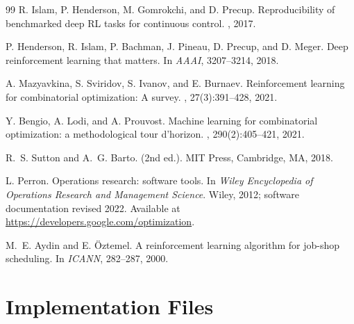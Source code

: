 \documentclass[10pt]{article}
\theoremstyle{definition}
\begin{document}
\begin{thebibliography}{99}
R. Islam, P. Henderson, M. Gomrokchi, and D. Precup.
\newblock Reproducibility of benchmarked deep RL tasks for
continuous control.
, 2017.

P. Henderson, R. Islam, P. Bachman, J. Pineau, D. Precup,
and D. Meger.
\newblock Deep reinforcement learning that matters.
\newblock In {\em AAAI}, 3207--3214, 2018.

A. Mazyavkina, S. Sviridov, S. Ivanov, and E. Burnaev.
\newblock Reinforcement learning for combinatorial
optimization: A survey.
, 27(3):391--428, 2021.

Y. Bengio, A. Lodi, and A. Prouvost.
\newblock Machine learning for combinatorial optimization:
a methodological tour d'horizon.
,
290(2):405--421, 2021.

R.~S. Sutton and A.~G. Barto.
(2nd ed.).
\newblock MIT Press, Cambridge, MA, 2018.

L. Perron.
\newblock Operations research: software tools.
\newblock In {\em Wiley Encyclopedia of Operations
Research and Management Science}.
Wiley, 2012; software documentation revised 2022.
\newblock Available at
\url{https://developers.google.com/optimization}.

M.~E. Aydin and E. \"Oztemel.
\newblock A reinforcement learning algorithm for
job-shop scheduling.
\newblock In {\em ICANN}, 282--287, 2000.

\end{thebibliography}

\appendix

\section{Implementation Files}
\label{app:files}
\end{document}
